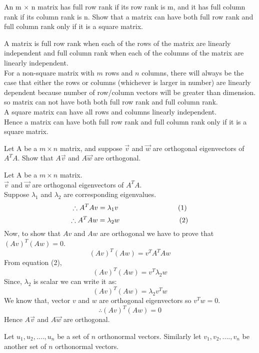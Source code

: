 \documentclass[solution,addpoints,12pt]{exam}
\newenvironment{Solution}{\begin{solution}}{\end{solution}}
\begin{document}
\begin{questions}
\question An m $\times$  n matrix has full row rank if its row rank is m, and it has full column rank if its column rank is n. Show that a matrix can have both full row rank and full column rank only if it is a square matrix.
\begin{Solution}
A matrix is full row rank when each of the rows of the matrix are linearly independent and full column rank when each of the columns of the matrix are linearly independent.\\

For a non-square matrix with $m$ rows and $n$ columns, there will always be the case that either the rows or columns (whichever is larger in number) are linearly dependent because number of row/column vectors will be greater than dimension. so matrix can not have both both full row rank and full column rank.\\

A square matrix can have all rows and columns linearly independent.\\

Hence a matrix can have both full row rank and full column rank only if it is a square matrix.
\end{Solution}


\question Let A be a $m\times n$ matrix, and suppose $\vec{v}$ and $\vec{w}$ are orthogonal eigenvectors of $A^{T}A$. Show that $A\vec{v}$ and $A\vec{w}$ are orthogonal.
\begin{Solution}
Let A be a $m\times n$ matrix.\\
$\vec{v}$ and $\vec{w}$ are orthogonal eigenvectors of $A^{T}A$.\\
Suppose $\lambda_1$ and $\lambda_2$ are corresponding eigenvalues.\\
\[\therefore A^{T}A v = \lambda_1 v\hspace*{30mm}(1)\]
\[\therefore A^{T}A w = \lambda_2 w\hspace*{30mm}(2)\]
Now, to show that $Av$ and $Aw$ are orthogonal we have to prove that $(Av)^{T}(Aw)=0$.\\
    \[(Av)^{T}(Aw) = v^{T}A^{T}Aw \]
From equation (2),
\[(Av)^{T}(Aw) = v^{T}\lambda_2w \]
Since, $\lambda_2$ is scalar we can write it as:
\[(Av)^{T}(Aw) = \lambda_2v^{T}w \]
We know that, vector $v$ and $w$ are orthogonal eigenvectors so $v^{T} w = 0$.\\
\[\therefore (Av)^{T}(Aw) = 0 \]
Hence $A\vec{v}$ and $A\vec{w}$ are orthogonal.
\end{Solution}

\question Let $u_{1}, u_2, ...., u_n$ be a set of $n$ orthonormal vectors. Similarly let $v_{1}, v_2, ...., v_n$ be another set of $n$ orthonormal vectors.
\begin{parts}

\end{parts}
\end{questions}
\end{document}
